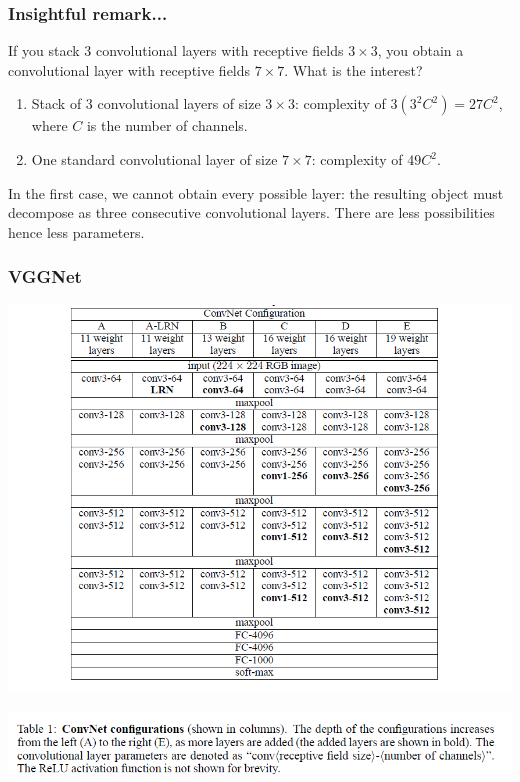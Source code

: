 \begin{frame}
	\frametitle{Insightful remark...}
	
	\justifying 
	
	If you stack 3 convolutional layers with receptive fields $3 \times 3$, you obtain a convolutional layer with receptive fields $7\times 7$. What is the interest?
	
	\bigskip
	
	\begin{enumerate}
		\item Stack of $3$ convolutional layers of size $3 \times 3$: complexity of $3(3^2C^2) =27C^2$, where $C$ is the number of channels. 
		
		\medskip 
		
		\item One standard convolutional layer of size $7 \times 7$: complexity of $49C^2$. 
	\end{enumerate}
	
	\bigskip 
	
	In the first case, we cannot obtain every possible layer: the resulting object must  decompose as three consecutive convolutional layers. There are less possibilities hence less parameters. 
	
	 
	
\end{frame}



\begin{frame}
	\frametitle{VGGNet}
	
	\begin{center}
		\includegraphics[scale=0.7]{figs/VGGNet_structure}
	\end{center}
	
	\begin{center}
		\includegraphics[scale=0.7]{figs/VGGNet_caption}
	\end{center}
\end{frame}







